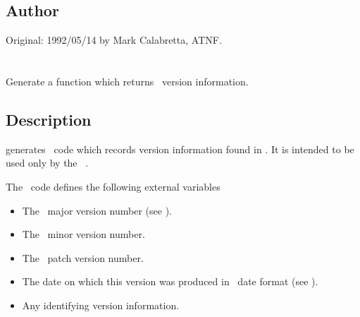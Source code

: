 \subsection*{Author}

Original: 1992/05/14 by Mark Calabretta, ATNF.


\newpage
\section{}
\label{doover}
 
Generate a function which returns \aipspp\ version information.

\begin{synopsis}
\end{synopsis}
 
\subsection*{Description}
 
 generates \cplusplus\ code which records version information
found in .  It is intended to be used only by the
\aipspp\ .

The \cplusplus\ code defines the following external variables

\begin{itemize}
\item
    The \aipspp\ major version number
   (see ).

\item
    The \aipspp\ minor version number.

\item
    The \aipspp\ patch version number.

\item
    The date on which this version was
   produced in \aipspp\ date format (see ).

\item
    Any identifying version
   information.
\end{itemize}
 
